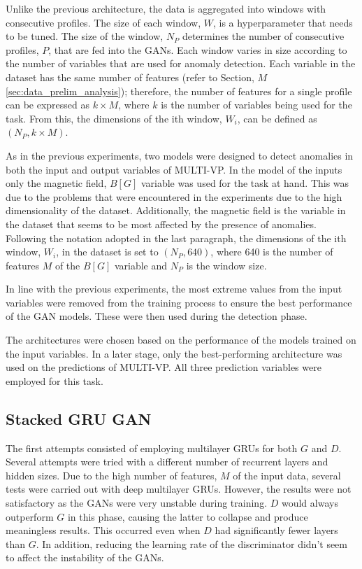 Unlike the previous architecture, the data is aggregated into windows with consecutive profiles. The size of each window, $W$, is a hyperparameter that needs to be tuned. The size of the window, $N_P$ determines the number of consecutive profiles, $P$, that are fed into the GANs. Each window varies in size according to the number of variables that are used for anomaly detection. Each variable in the dataset has the same number of features (refer to Section, $M$ \ref{sec:data_prelim_analysis}); therefore, the number of features for a single profile can be expressed as $k\times M$, where $k$ is the number of variables being used for the task. From this, the dimensions of the ith window, $W_i$, can be defined as $(N_P, k\times M)$.

As in the previous experiments, two models were designed to detect anomalies in both the input and output variables of MULTI-VP. In the model of the inputs only the magnetic field, $B [G]$ variable was used for the task at hand. This was due to the problems that were encountered in the experiments due to the high dimensionality of the dataset. Additionally, the magnetic field is the variable in the dataset that seems to be most affected by the presence of anomalies. Following the notation adopted in the last paragraph, the dimensions of the ith window, $W_{i}$, in the dataset is set to $(N_P, 640)$, where 640 is the number of features $M$ of the $B [G]$ variable and $N_P$ is the window size.

In line with the previous experiments, the most extreme values from the input variables were removed from the training process to ensure the best performance of the GAN models. These were then used during the detection phase.


The architectures were chosen based on the performance of the models trained on the input variables. In a later stage, only the best-performing architecture was used on the predictions of MULTI-VP. All three prediction variables were employed for this task.


\subsection{Stacked GRU GAN}
The first attempts consisted of employing multilayer GRUs for both $G$ and $D$. Several attempts were tried with a different number of recurrent layers and hidden sizes. Due to the high number of features, $M$ of the input data, several tests were carried out with deep multilayer GRUs. However, the results were not satisfactory as the GANs were very unstable during training. $D$ would always outperform $G$ in this phase, causing the latter to collapse and produce meaningless results. This occurred even when $D$ had significantly fewer layers than $G$. In addition, reducing the learning rate of the discriminator didn't seem to affect the instability of the GANs. 

